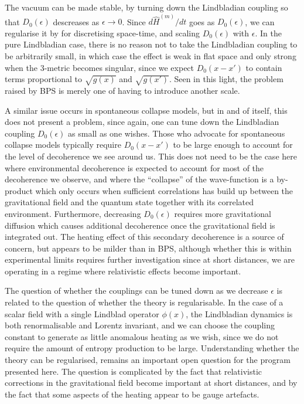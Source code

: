 \documentclass[aps,pra,showpacs,citeautoscript,amsmath,amssymb,floatfix,superscriptaddress,bbm, verbatim,amsfonts,changes,12pt,nofootinbib,longbibliography]{revtex4-2}
\def\qmatterham{\hat{H}^{(m)}}
\begin{document}
The vacuum can be made stable, by turning down the Lindbladian coupling so that $D_0(\epsilon)$ descreases as $\epsilon\rightarrow 0$. Since $d{\qmatterham}/dt$ goes as $D_0(\epsilon)$, we can regularise it by for discretising space-time, and scaling $D_0(\epsilon)$ with $\epsilon$. 
In the pure Lindbladian case, there is no reason not to take the Lindbladian coupling to be arbitrarily small, in which case the effect is weak in flat space and only strong when the 3-metric becomes singular, since we expect $D_0(x-x')$ to contain terms proportional to $\sqrt{g(x)}$ and $\sqrt{g(x')}$. Seen in this light, the problem raised by BPS is merely one of having to introduce another scale.

A similar issue occurs in spontaneous collapse models\cite{ballentine1991failure,gallis1991comparison,shimony1990desiderata}, but in and of itself, this does not present a problem, since again, one can tune down the Lindbladian coupling $D_0(\epsilon)$ as small as one wishes. Those who advocate for spontaneous collapse models typically require $D_0(x-x')$ to be large enough to account for the level of decoherence we see around us. This does not need to be the case here where environmental decoherence is expected to account for most of the decoherence we observe, and where the ``collapse'' of the wave-function is a by-product which only occurs when sufficient correlations has build up between the gravitational field and the quantum state together with its correlated environment. Furthermore, decreasing $D_0(\epsilon)$ requires more gravitational diffusion\cite{oppenheim2021gravitationally} which causes additional decoherence once the gravitational field is integrated out\cite{tilloy2016sourcing,UCLcoherence}. The heating effect of this secondary decoherence is a source of concern, but appears to be milder than in BPS\cite{UCLcoherence,oppenheim2021gravitationally}, although whether this is within experimental limits requires further investigation since at short distances, we are operating in a regime where relativistic effects become important.


The question of whether the couplings can be tuned down as we decrease $\epsilon$ is related to the question of whether the theory is regularisable\cite{oppenheim2023path}. 
In the case of a scalar field with a single Lindblad operator $\phi(x)$, the Lindbladian dynamics is both renormalisable and Lorentz invariant\cite{baidya2017renormalization,UCLLorentz}, and we can choose the coupling constant to generate as little anomalous heating as we wish, since we do not require the amount of entropy production to be large.
 Understanding whether the theory can be regularised, remains an important open question for the program presented here. The question is complicated by the fact that relativistic corrections in the gravitational field become important at short distances\cite{UCLDMDNE}, and by the fact that some aspects of the heating appear to be gauge artefacts\cite{layton2023weak}. %
\end{document}
